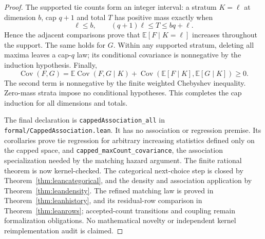 \documentclass[11pt]{article}
\begin{document}
\begin{proof}
The supported tie counts form an integer interval: a stratum $K=\ell$
at dimension $b$, cap $q+1$ and total $T$ has positive mass exactly when
\[
 \ell\leq b,\qquad (q+1)\ell\leq T\leq bq+\ell.
\]
Hence the adjacent comparisons prove that $\mathbb E[F\mid K=\ell]$
increases throughout the support. The same holds for $G$.
Within any supported stratum, deleting all maxima leaves a cap-$q$ law;
its conditional covariance is nonnegative by the induction hypothesis.
Finally,
\[
 \operatorname{Cov}(F,G)
 =\mathbb E\operatorname{Cov}(F,G\mid K)
  +\operatorname{Cov}(\mathbb E[F\mid K],\mathbb E[G\mid K])\geq0.
\]
The second term is nonnegative by the finite weighted Chebyshev
inequality. Zero-mass strata impose no conditional hypotheses. This
completes the cap induction for all dimensions and totals.

The final declaration is \texttt{cappedAssociation\_all} in
\texttt{formal/CappedAssociation.lean}. It has no association or
regression premise. Its corollaries prove tie regression for arbitrary
increasing statistics defined only on the capped space, and
\texttt{capped\_maxCount\_covariance}, the association specialization
needed by the matching hazard argument. The finite rational theorem
is now kernel-checked. The categorical next-choice step is closed by
Theorem~\ref{thm:leancategorical}, and the density and association
application by Theorem~\ref{thm:leandensity}. The refined matching law is
proved in Theorem~\ref{thm:leanhistory}, and its residual-row comparison
in Theorem~\ref{thm:leanrows}; accepted-count transitions and coupling remain formalization obligations. No mathematical
novelty or independent kernel reimplementation audit is claimed.
\end{proof}
\end{document}
